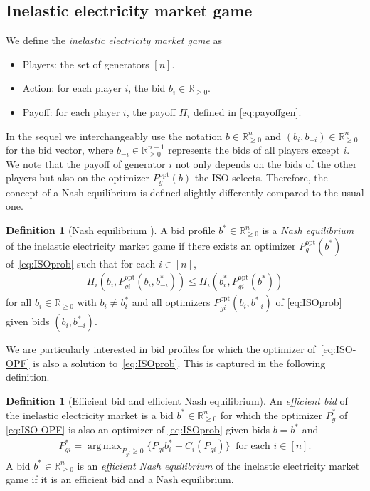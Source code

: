 \documentclass[journal]{IEEEtran}
\newcommand{\1}{\mathds 1}
\newcommand{\realnonnegative}{{\mathbb{R}}_{\ge 0}}
\newcommand{\until}[1]{[#1]}
\DeclareMathOperator*{\argmax}{arg\,max}
\theoremstyle{remark}
\theoremstyle{definition}
\newtheorem{definition}[theorem]{Definition}
\begin{document}
\subsection{Inelastic electricity market game}
We define the \emph{inelastic electricity market game} as
% 
\begin{itemize}
\item Players: the set of generators $\until{n}$.
\item Action: for each player $i$, the bid $b_i\in\realnonnegative$.
\item Payoff: for each player $i$, the payoff $\Pi_i$ defined in
  \eqref{eq:payoffgen}.
\end{itemize}
%
\noindent In the sequel we interchangeably use the notation
$b\in\realnonnegative^n$ and $(b_i,b_{-i})\in\realnonnegative^n$ for
the bid vector, where $b_{-i}\in\realnonnegative^{n-1}$ represents the
bids of all players except $i$. We note that the payoff of generator
$i$ not only depends on the bids of the other players but also on the
optimizer $P_g^{\text{opt}}(b)$ the ISO selects. Therefore, the
concept of a Nash equilibrium is defined slightly differently compared
to the usual one.
%
\begin{definition}[Nash equilibrium \cite{cherukuri2016decentralized}]
  A bid profile $b^*\in\realnonnegative^n$ is a \emph{Nash equilibrium}
  of the inelastic electricity market game if there exists an optimizer
  $P_{g}^{\text{opt}}(b^*)$ of~\eqref{eq:ISOprob} such that for each
  $i\in\until{n}$,
\begin{align*}
  \Pi_i(b_i,P_{gi}^{\text{opt}}(b_i,b_{-i}^*))\leq
  \Pi_i(b_i^*,P_{gi}^{\text{opt}}(b^*))
\end{align*}
for all $b_i\in\realnonnegative$ with $ b_i\neq b_i^*$ and all
optimizers $P_{gi}^{\text{opt}}(b_i,b_{-i}^*)$ of \eqref{eq:ISOprob}
given bids $(b_i,b_{-i}^*)$.
\end{definition}
%
We are particularly interested in bid profiles for which the optimizer
of~\eqref{eq:ISO-OPF} is also a solution to~\eqref{eq:ISOprob}. This is
captured in the following definition.
%
\begin{definition}[Efficient bid and efficient Nash equilibrium]
  An \emph{efficient bid} of the inelastic electricity market is a bid
  $b^*\in\realnonnegative^n$ for which the optimizer $P_g^*$ of
  \eqref{eq:ISO-OPF} is also an optimizer of \eqref{eq:ISOprob}
  given bids $b=b^*$ and
  \begin{align}\label{eq:eff-bid}
    P_{gi}^*=\argmax_{P_{gi}\ge0}\{P_{gi} b^*_i-C_i(P_{gi})\}\ \text{ for each } i
    \in \until{n}.
  \end{align}
  A bid $b^*\in\realnonnegative^n$ is an \emph{efficient Nash
    equilibrium} of the inelastic electricity market game if it is an
  efficient bid and a Nash equilibrium.
\end{definition}
\end{document}
